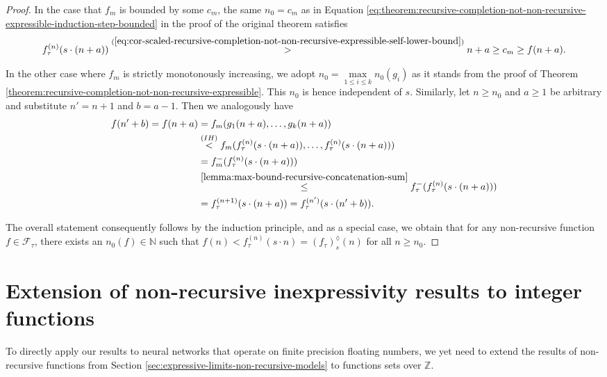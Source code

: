 \begin{proof}
	In the case that $f_m$ is bounded by some $c_m$, the same $n_0=c_m$ as in Equation \ref{eq:theorem:recursive-completion-not-non-recursive-expressible-induction-step-bounded} in the proof of the original theorem satisfies 
	\begin{align}
		f_{\tau}^{(n)}(s\cdot (n+a)) \overset{(\ref{eq:cor-scaled-recursive-completion-not-non-recursive-expressible-self-lower-bound})}{>} n+a \geq c_m \geq f(n+a).
	\end{align}
	
	In the other case where $f_m$ is strictly monotonously increasing, we adopt $n_0=\underset{1\leq i\leq k}{\max}n_0(g_i)$ as it stands from the proof of Theorem \ref{theorem:recursive-completion-not-non-recursive-expressible}.
	This $n_0$ is hence independent of $s$.
	Similarly, let $n\geq n_0$ and $a\geq 1$ be arbitrary and substitute $n'=n+1$ and $b=a-1$. Then we analogously have
	\begin{align}
		f(n'+b)=f(n+a)&=f_m(g_1(n+a),\dots,g_k(n+a))\\
		&\overset{(IH)}{<}f_m(f_\tau^{(n)}(s\cdot (n+a)),\dots,f_\tau^{(n)}(s\cdot (n+a)))\\
		&=f_m^{-}(f_\tau^{(n)}(s\cdot (n+a)))\\
		&\overset{\ref{lemma:max-bound-recursive-concatenation-sum}}{\leq} f_\tau^{-}(f_\tau^{(n)}(s\cdot (n+a)))\\
		&=f_{\tau}^{(n+1)}(s\cdot (n+a))=f_{\tau}^{(n')}(s\cdot(n'+b)).
	\end{align}
	
	The overall statement consequently follows by the induction principle, and as a special case, we obtain that for any non-recursive function $f\in\mathcal{F}_{\tau}$, there exists an $n_0(f)\in\mathbb{N}$ such that $f(n)<f_{\tau}^{(n)}(s\cdot n)=\left(f_{\tau}\right)_{s}^{\lozenge}(n)$ for all $n\geq n_0$.
	
\end{proof}

\section{Extension of non-recursive inexpressivity results to integer functions}
\label{app:extension-inexpressivity-integer}
To directly apply our results to neural networks that operate on finite precision floating numbers, we yet need to extend the results of non-recursive functions from Section \ref{sec:expressive-limits-non-recursive-models} to functions sets over $\mathbb{Z}$.

